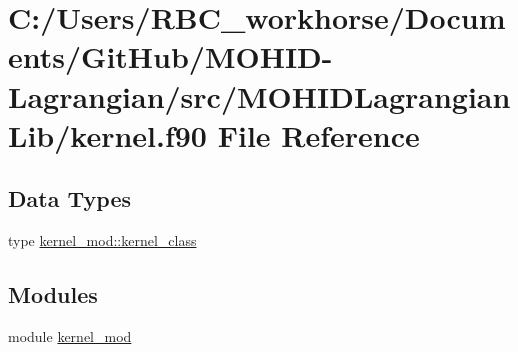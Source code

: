 \hypertarget{kernel_8f90}{}\section{C\+:/\+Users/\+R\+B\+C\+\_\+workhorse/\+Documents/\+Git\+Hub/\+M\+O\+H\+I\+D-\/\+Lagrangian/src/\+M\+O\+H\+I\+D\+Lagrangian\+Lib/kernel.f90 File Reference}
\label{kernel_8f90}
\subsection*{Data Types}
\begin{DoxyCompactItemize}
\item 
type \mbox{\hyperlink{structkernel__mod_1_1kernel__class}{kernel\+\_\+mod\+::kernel\+\_\+class}}
\end{DoxyCompactItemize}
\subsection*{Modules}
\begin{DoxyCompactItemize}
\item 
module \mbox{\hyperlink{namespacekernel__mod}{kernel\+\_\+mod}}
\end{DoxyCompactItemize}
